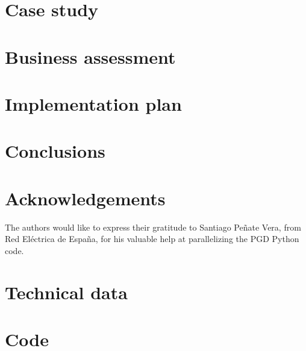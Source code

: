 \documentclass[a4paper, ]{article} %
\begin{document}
\newpage
\section{Case study}\label{Case}


\clearpage
\newpage
\section{Business assessment}\label{Implementation}  %


\newpage
\section{Implementation plan}\label{Plan}


\newpage
\section{Conclusions}\label{Conclusions}


\newpage
\section*{Acknowledgements}
\label{sec:ack}
The authors would like to express their gratitude to Santiago Peñate Vera, from Red Eléctrica de España, for his valuable help at parallelizing the PGD Python code.

\newpage
\printbibliography[heading=bibintoc]

\newpage
\appendix

\newpage
\section{Technical data}


\newpage
\section{Code}

\end{document}
